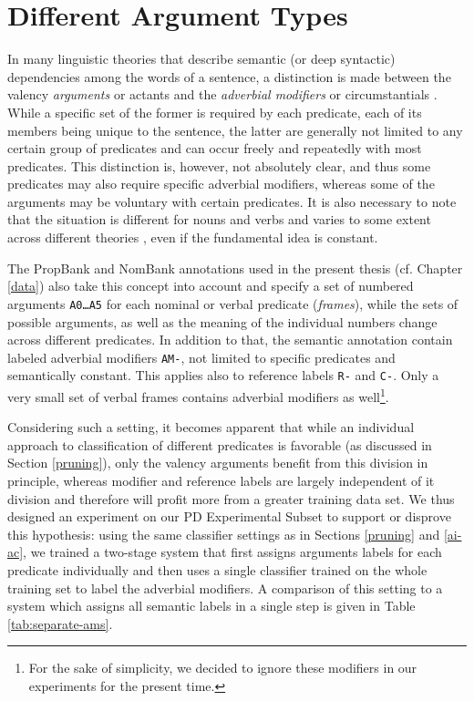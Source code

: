 \documentclass[12pt,notitlepage]{report}
\begin{document}
\section{Different Argument Types}\label{arg-types}

In many linguistic theories that describe semantic (or deep syntactic) dependencies among the words of a sentence, a distinction is made between the valency \emph{arguments} or actants and the \emph{adverbial modifiers} or circumstantials \citep[p. 100ff.]{sgall86}. While a specific set of the former is required by each predicate, each of its members being unique to the sentence, the latter are generally not limited to any certain group of predicates and can occur freely and repeatedly with most predicates. This distinction is, however, not absolutely clear, and thus some predicates may also require specific adverbial modifiers, whereas some of the arguments may be voluntary with certain predicates. It is also necessary to note that the situation is different for nouns and verbs and varies to some extent across different theories \citep{rambow03}, even if the fundamental idea is constant.

The PropBank \citep{kingsbury02,palmer05} and NomBank \citep{meyers04} annotations used in the present thesis (cf. Chapter \ref{data}) also take this concept into account and specify a set of numbered arguments \texttt{A0\dots A5} for each nominal or verbal predicate (\emph{frames}), while the sets of possible arguments, as well as the meaning of the individual numbers change across different predicates. In addition to that, the semantic annotation contain labeled adverbial modifiers \texttt{AM-}, not limited to specific predicates and semantically constant. This applies also to reference labels \texttt{R-} and \texttt{C-}. Only a very small set of verbal frames contains adverbial modifiers as well\footnote{For the sake of simplicity, we decided to ignore these modifiers in our experiments for the present time.}.

Considering such a setting, it becomes apparent that while an individual approach to classification of different predicates is favorable (as discussed in Section \ref{pruning}), only the valency arguments benefit from this division in principle, whereas modifier and reference labels are largely independent of it division and therefore will profit more from a greater training data set. We thus designed an experiment on our PD Experimental Subset to support or disprove this hypothesis: using the same classifier settings as in Sections \ref{pruning} and \ref{ai-ac}, we trained a two-stage system that first assigns arguments labels for each predicate individually and then uses a single classifier trained on the whole training set to label the adverbial modifiers. A comparison of this setting to a system which assigns all semantic labels in a single step is given in Table \ref{tab:separate-ams}.
\end{document}

